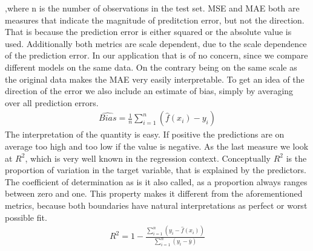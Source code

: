 ,where n is the number of observations in the test set. MSE and MAE both are measures that indicate the magnitude of preditction error, but not the direction. That is because the prediction error is either squared or the absolute value is used. Additionally both metrics are scale dependent, due to the scale dependence of the prediction error. In our application that is of no concern, since we compare different models on the same data. On the contrary being on the same scale as the original data makes the MAE very easily interpretable. To get an idea of the direction of the error we also include an estimate of bias, simply by averaging over all prediction errors.
\begin{align}
\hat{Bias}=\frac{1}{n}\sum_{i=1}^n(\hat{f}(x_i)-y_i)
\end{align}
The interpretation of the quantity is easy. If positive the predictions are on average too high and too low if the value is negative. As the last measure we look at $R^2$, which is very well known in the regression context. Conceptually $R^2$ is the proportion of variation in the target variable, that is explained by the predictors. The coefficient of determination as is it also called, as a proportion always ranges between zero and one. This property makes it different from the aforementioned metrics, because both boundaries have natural interpretations as perfect or worst possible fit.
\begin{align}
R^2=1-\frac{\sum_{i=1}^n(y_i-\hat{f}(x_i))}{\sum_{i=1}^n(y_i-\bar{y})}
\end{align}  